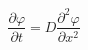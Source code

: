 \begin{equation} \label{eq:fick-second}
    \frac{\partial \varphi}{\partial t}=D \frac{\partial^{2} \varphi}{\partial x^{2}}
\end{equation}



